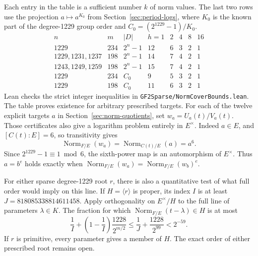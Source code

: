 \documentclass[11pt]{article}
\begin{document}
Each entry in the table is a sufficient number \(k\) of norm values.
The last two rows use the projection \(a\mapsto a^{K_0}\) from
Section~\ref{sec:period-logs}, where \(K_0\) is the known part of the
degree-1229 group order and \(C_0=(2^{1229}-1)/K_0\).
\[
\begin{array}{l|r|l|rrrrr}
 n&m&|D|&h=1&2&4&8&16\\\hline
 1229&234&2^n-1&12&6&3&2&1\\
 1229,1231,1237&198&2^n-1&14&7&4&2&1\\
 1243,1249,1259&198&2^n-1&15&7&4&2&1\\
 1229&234&C_0&9&5&3&2&1\\
 1229&198&C_0&11&6&3&2&1
\end{array}
\]
Lean checks the strict integer inequalities in
\nolinkurl{GF2Sparse/NormCoverBounds.lean}. The table proves existence
for arbitrary prescribed targets. For each of the twelve explicit targets
\(a\) in Section~\ref{sec:norm-quotients}, set \(w_a=U_a(t)/V_a(t)\).
Those certificates also give a logarithm problem entirely in \(E^\times\).
Indeed \(a\in E\), and \([C(t):E]=6\), so transitivity gives
\[
       \operatorname{Norm}_{F/E}(w_a)
       =\operatorname{Norm}_{C(t)/E}(a)=a^6.
\]
Since \(2^{1229}-1\equiv1\bmod6\), the sixth-power map is an
automorphism of \(E^\times\). Thus \(a=b^e\) holds exactly when
\(\operatorname{Norm}_{F/E}(w_a)=\operatorname{Norm}_{F/E}(w_b)^e\).

For either sparse degree-1229 root \(r\), there is also a quantitative
test of what full order would imply on this line. If \(H=\langle
r\rangle\) is proper, its index \(I\) is at least
\(J=818085338814611458\). Apply orthogonality on \(E^\times/H\) to
the full line of parameters \(\lambda\in K\). The fraction for which
\(\operatorname{Norm}_{F/E}(t-\lambda)\in H\) is at most
\[
 \frac1I+\left(1-\frac1I\right)\frac{1228}{2^{m/2}}
 \le \frac1J+\frac{1228}{2^{99}} < 2^{-59}.
\]
If \(r\) is primitive, every parameter gives a member of \(H\).
The exact order of either prescribed root remains open.
\end{document}
